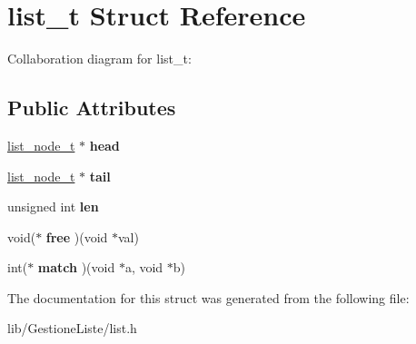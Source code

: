 \hypertarget{structlist__t}{}\section{list\+\_\+t Struct Reference}
\label{structlist__t}


Collaboration diagram for list\+\_\+t\+:
\subsection*{Public Attributes}
\begin{DoxyCompactItemize}
\item 
\mbox{\label{structlist__t_a93ef6d995af96e73e226dc2b8a7232aa}} 
\hyperlink{structlist__node}{list\+\_\+node\+\_\+t} $\ast$ {\bfseries head}
\item 
\mbox{\label{structlist__t_a45dc80e38f8869f66e5d006117aae5f2}} 
\hyperlink{structlist__node}{list\+\_\+node\+\_\+t} $\ast$ {\bfseries tail}
\item 
\mbox{\label{structlist__t_aba275113a143fe39c162f547c6792502}} 
unsigned int {\bfseries len}
\item 
\mbox{\label{structlist__t_adbc5f9e0707a09a027c89218ff0a8f69}} 
void($\ast$ {\bfseries free} )(void $\ast$val)
\item 
\mbox{\label{structlist__t_a3cf6cc60206869f52386f1f72e161839}} 
int($\ast$ {\bfseries match} )(void $\ast$a, void $\ast$b)
\end{DoxyCompactItemize}


The documentation for this struct was generated from the following file\+:\begin{DoxyCompactItemize}
\item 
lib/\+Gestione\+Liste/list.\+h\end{DoxyCompactItemize}
